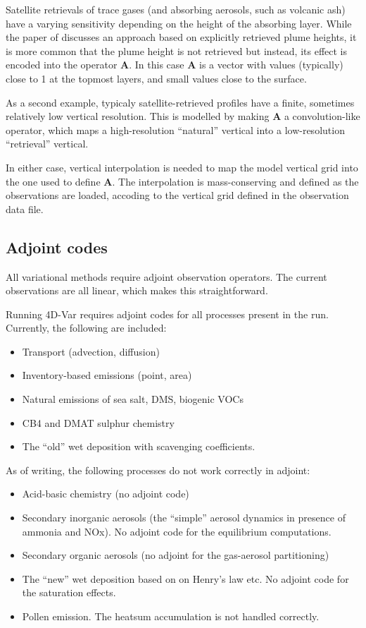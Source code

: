 \documentclass[a4paper]{article}
\begin{document}
Satellite retrievals of trace gases (and absorbing aerosols, such as volcanic ash) have a
varying sensitivity depending on the height of the absorbing layer. While the paper of
\citet{Vira2016} discusses an approach based on explicitly retrieved plume heights, it is
more common that the plume height is not retrieved but instead, its effect is encoded into
the operator $\mathbf{A}$. In this case $\mathbf{A}$ is a vector with values (typically)
close to 1 at the topmost layers, and small values close to the surface. 

As a second example, typicaly satellite-retrieved profiles have a finite, sometimes
relatively low vertical resolution. This is modelled by making $\mathbf{A}$ a
convolution-like operator, which maps a high-resolution ``natural'' vertical into a
low-resolution ``retrieval'' vertical. 

In either case, vertical interpolation is needed to map the model vertical grid into the
one used to define $\mathbf{A}$. The interpolation is mass-conserving and defined as the
observations are loaded, accoding to the vertical grid defined in the observation data
file.

\subsection{Adjoint codes}
\label{sec:adjoint}

All variational methods require adjoint observation operators. The current observations
are all linear, which makes this straightforward.

Running 4D-Var requires adjoint codes for all processes present in the run. Currently, the
following are included:
\begin{itemize}
\item Transport (advection, diffusion)
\item Inventory-based emissions (point, area)
\item Natural emissions of sea salt, DMS, biogenic VOCs
\item CB4 and DMAT sulphur chemistry
\item The ``old'' wet deposition with scavenging coefficients.
\end{itemize}
As of writing, the following processes do not work correctly in adjoint:
\begin{itemize}
\item Acid-basic chemistry (no adjoint code)
\item Secondary inorganic aerosols (the ``simple'' aerosol dynamics in presence of ammonia
  and NOx). No adjoint code for the equilibrium computations.
\item Secondary organic aerosols (no adjoint for the gas-aerosol partitioning)
\item The ``new'' wet deposition based on on Henry's law etc. No adjoint code for the
  saturation effects.
\item Pollen emission. The heatsum accumulation is not handled correctly.
\end{itemize}
\end{document}

